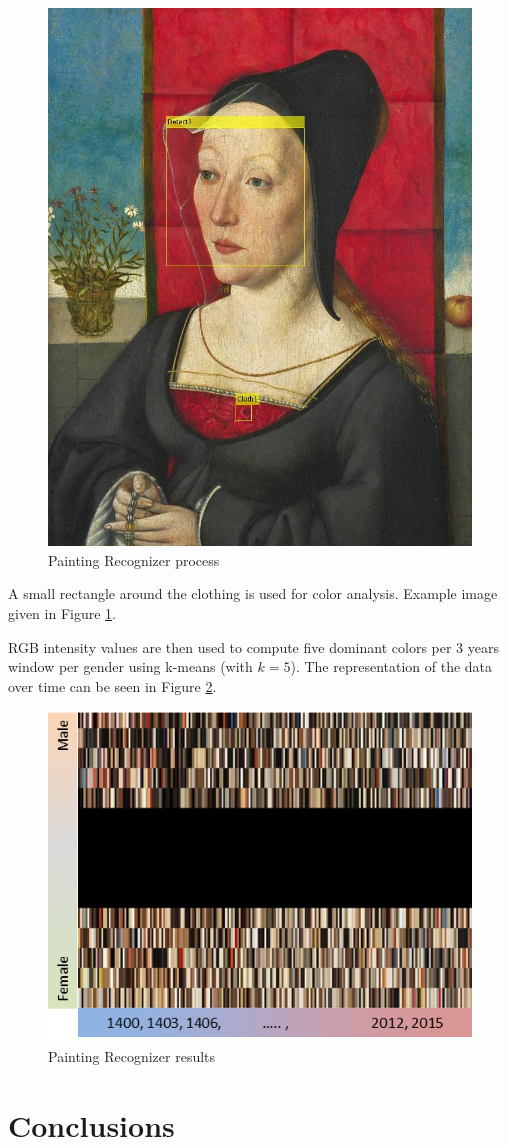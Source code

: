 \documentclass[runningheads]{llncs}
\begin{document}
\begin{figure}
	\centering
	\includegraphics[width=.5\textwidth]{PaintingRecognizer-matlab_results}
	\caption{Painting Recognizer process}
	\label{pr-process}	
\end{figure}

A small rectangle around the clothing is used for color analysis. Example image given in Figure \ref{pr-process}. 

RGB intensity values are then used to compute five dominant colors per 3 years window per gender using k-means (with $k=5$). The representation of the data over time can be seen in Figure \ref{pr-result}.

\begin{figure}
	\centering
	\includegraphics[width=.5\textwidth]{PaintingRecognizer-results}
	\caption{Painting Recognizer results}
	\label{pr-result}	
\end{figure}


\section{Conclusions}

\clearpage



\end{document}
